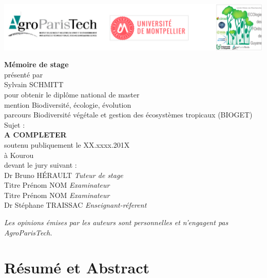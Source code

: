 \documentclass[12pt,]{article}
\let\oldsection\section
\renewcommand\section{\newpage\oldsection}
\theoremstyle{definition}
\theoremstyle{definition}
\theoremstyle{remark}
\begin{document}
  \includegraphics{images/logos}
  
  \begin{center}
    \LARGE{\textbf{Mémoire de stage}} \\
    \vspace*{\fill}
    \large{présenté par} \\
    \large{Sylvain SCHMITT} \\
    \vspace*{\fill}
    \large{pour obtenir le diplôme national de master} \\
    \large{mention Biodiversité, écologie, évolution} \\
    \small{parcours Biodiversité végétale et gestion des écosystèmes tropicaux (BIOGET)} \\
    \vspace*{\fill}
    \large{Sujet :} \\
    \Large{\textbf{A COMPLETER}} \\
    \vspace*{\fill}
    \large{soutenu publiquement le XX.xxxx.201X} \\
    \large{à Kourou} \\
    \vspace*{\fill}
    \large{devant le jury suivant :} \\
    \vspace*{\fill}
    Dr Bruno HÉRAULT  \emph{Tuteur de stage} \\
    Titre Prénom NOM  \emph{Examinateur} \\
    Titre Prénom NOM  \emph{Examinateur} \\
    Dr Stéphane TRAISSAC  \emph{Enseignant-réferent} \\
  \end{center}
  
  \newpage
  \vspace*{\fill}
  \emph{Les opinions émises par les auteurs sont personnelles et n'engagent pas AgroParisTech.}
  \newpage

\tableofcontents

\section*{Résumé et Abstract}\label{resume-et-abstract}
\end{document}
